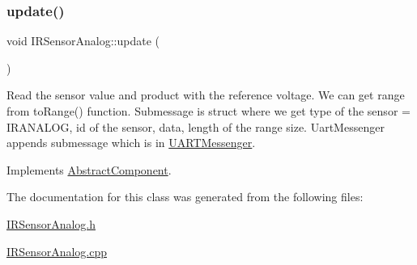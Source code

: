 \subsubsection{\texorpdfstring{update()}{update()}}
{\footnotesize\ttfamily void I\+R\+Sensor\+Analog\+::update (\begin{DoxyParamCaption}{ }\end{DoxyParamCaption})\hspace{0.3cm}{\ttfamily [virtual]}}

Read the sensor value and product with the reference voltage. We can get range from to\+Range() function. Submessage is struct where we get type of the sensor = I\+R\+A\+N\+A\+L\+OG, id of the sensor, data, length of the range size. Uart\+Messenger appends submessage which is in \hyperlink{class_u_a_r_t_messenger}{U\+A\+R\+T\+Messenger}. 

Implements \hyperlink{class_abstract_component_af25a90b8ab213762221c3b358d9873f3}{Abstract\+Component}.



The documentation for this class was generated from the following files\+:\begin{DoxyCompactItemize}
\item 
\hyperlink{_i_r_sensor_analog_8h}{I\+R\+Sensor\+Analog.\+h}\item 
\hyperlink{_i_r_sensor_analog_8cpp}{I\+R\+Sensor\+Analog.\+cpp}\end{DoxyCompactItemize}

